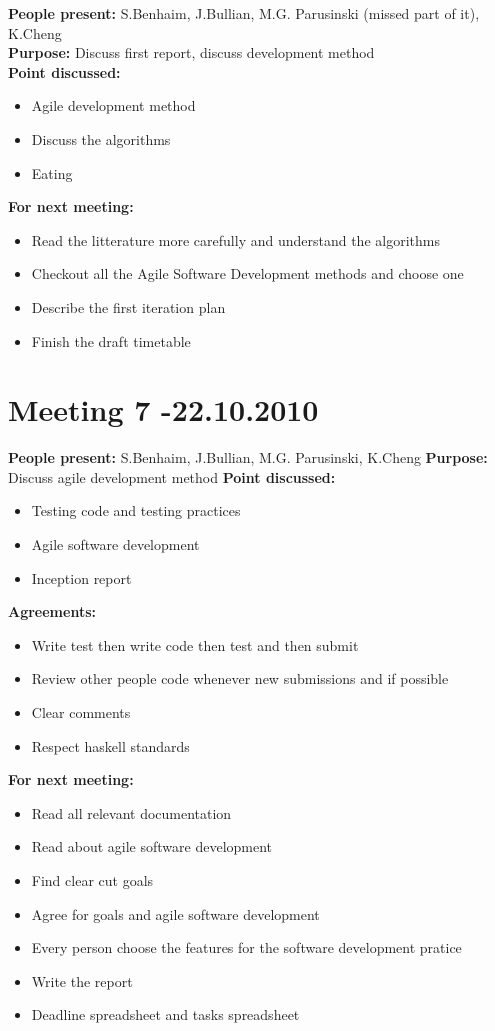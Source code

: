 \documentclass[12pt]{article}
\begin{document}
\textbf{People present:} S.Benhaim, J.Bullian, M.G. Parusinski (missed part of it), K.Cheng \\
\textbf{Purpose:} Discuss first report, discuss development method \\
\textbf{Point discussed:}
\begin{itemize}
\item Agile development method
\item Discuss the algorithms
\item Eating
\end{itemize}
\textbf{For next meeting:}
\begin{itemize}
\item Read the litterature more carefully and understand the algorithms
\item Checkout all the Agile Software Development methods and choose one
\item Describe the first iteration plan
\item Finish the draft timetable
\end{itemize}

\section*{Meeting 7 -22.10.2010}

\textbf{People present:} S.Benhaim, J.Bullian, M.G. Parusinski, K.Cheng
\textbf{Purpose:} Discuss agile development method
\textbf{Point discussed:}
\begin{itemize}
\item Testing code and testing practices
\item Agile software development
\item Inception report
\end{itemize}
\textbf{Agreements:}
\begin{itemize}
\item Write test then write code then test and then submit
\item Review other people code whenever new submissions and if possible
\item Clear comments
\item Respect haskell standards
\end{itemize}
\textbf{For next meeting:}
\begin{itemize}
\item Read all relevant documentation
\item Read about agile software development
\item Find clear cut goals
\item Agree for goals and agile software development
\item Every person choose the features for the software development pratice
\item Write the report
\item Deadline spreadsheet and tasks spreadsheet
\end{itemize}
\end{document}
